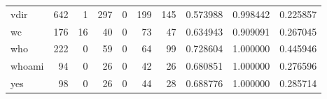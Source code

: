 \begin{tabular}{lrrrrrrrrr}
vdir      &                                                642 &                                                  1 &                                                297 &                                                  0 &                                                199 &                                                145 &                                           0.573988 &                               0.998442 &                             0.225857 \\
wc        &                                                176 &                                                 16 &                                                 40 &                                                  0 &                                                 73 &                                                 47 &                                           0.634943 &                               0.909091 &                             0.267045 \\
who       &                                                222 &                                                  0 &                                                 59 &                                                  0 &                                                 64 &                                                 99 &                                           0.728604 &                               1.000000 &                             0.445946 \\
whoami    &                                                 94 &                                                  0 &                                                 26 &                                                  0 &                                                 42 &                                                 26 &                                           0.680851 &                               1.000000 &                             0.276596 \\
yes       &                                                 98 &                                                  0 &                                                 26 &                                                  0 &                                                 44 &                                                 28 &                                           0.688776 &                               1.000000 &                             0.285714 \\
\bottomrule
\end{tabular}
